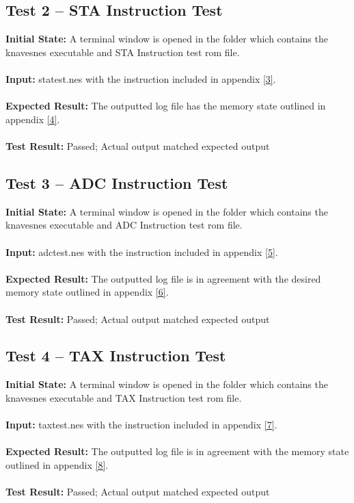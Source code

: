 \documentclass[12pt]{article}
\begin{document}
	\subsection{Test 2 – STA Instruction Test}
		\textbf{Initial State: } A terminal window is opened in the folder which contains the knavesnes executable and STA Instruction test rom file.\\\\
		\textbf{Input: } statest.nes with the instruction included in appendix \hyperlink{appendix}{[3]}.\\\\
		\textbf{Expected Result: } The outputted log file has the memory state outlined in appendix \hyperlink{appendix}{[4]}.\\\\
		\textbf{Test Result: } Passed; Actual output matched expected output

	\subsection{Test 3 – ADC Instruction Test}
		\textbf{Initial State: } A terminal window is opened in the folder which contains the knavesnes executable and ADC Instruction test rom file.\\\\
		\textbf{Input: } adctest.nes with the instruction included in appendix \hyperlink{appendix}{[5]}.\\\\
		\textbf{Expected Result: }The outputted log file is in agreement with the desired memory state outlined in appendix \hyperlink{appendix}{[6]}.\\\\
		\textbf{Test Result: } Passed; Actual output matched expected output

	\subsection{Test 4 – TAX Instruction Test}
		\textbf{Initial State: } A terminal window is opened in the folder which contains the knavesnes executable and TAX Instruction test rom file.\\\\
		\textbf{Input: } taxtest.nes with the instruction included in appendix \hyperlink{appendix}{[7]}.\\\\
		\textbf{Expected Result: } The outputted log file is in agreement with the memory state outlined in appendix \hyperlink{appendix}{[8]}.\\\\
		\textbf{Test Result: } Passed; Actual output matched expected output
\end{document}
